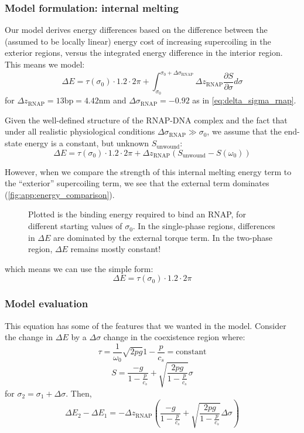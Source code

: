 \documentclass[11pt]{article}
\begin{document}
\subsubsection{Model formulation: internal melting}
Our model derives energy differences based on the difference between the (assumed to be locally linear) energy cost of increasing supercoiling in the exterior regions,
versus the integrated energy difference in the interior region. This means we model:
\[\Delta E = \tau(\sigma_0) \cdot 1.2 \cdot 2\pi + \int_{\sigma_0}^{\sigma_0 + \Delta \sigma_\text{RNAP}} \Delta z_\text{RNAP} \frac{\partial S}{\partial \sigma} d\sigma\]
for \(\Delta z_\text{RNAP} = 13 \text{bp} = 4.42 \text{nm}\) and \(\Delta \sigma_\text{RNAP} = -0.92\) as in \autoref{eq:delta_sigma_rnap}.

Given the well-defined structure of the RNAP-DNA complex and the fact that under all realistic physiological conditions \(\Delta \sigma_\text{RNAP} \gg \sigma_0\), we assume that the end-state energy is a constant, but unknown \(S_\text{unwound}\):
\begin{equation}
    \Delta E = \tau(\sigma_0) \cdot 1.2 \cdot 2\pi + \Delta z_\text{RNAP} \left(S_\text{unwound} - S(\omega_0)\right)
\end{equation}


However, when we compare the strength of this internal melting energy term to the ``exterior'' supercoiling term, we see that the external term dominates (\autoref{fig:app:energy_comparison}).
\begin{figure}[h]
    \centering
    \caption{Plotted is the binding energy required to bind an RNAP, for different starting values of \(\sigma_0\). In the single-phase regions, differences in \(\Delta E\) are dominated by the external torque term. In the two-phase region, \(\Delta E\) remains mostly constant!}
    \label{fig:app:energy_comparison}
\end{figure}
which means we can use the simple form:
\begin{equation}
    \Delta E = \tau(\sigma_0) \cdot 1.2 \cdot 2\pi
\end{equation}


\FloatBarrier
\subsubsection{Model evaluation}
This equation has some of the features that we wanted in the model. Consider the change in \(\Delta E\) by a \(\Delta \sigma\) change in the coexistence region where:
\[\tau = \frac{1}{\omega_0} \sqrt{2pg}{1 - \frac{p}{c_s}} = \text{constant}\]
\[S = \frac{-g}{1 - \frac{p}{c_s}} + \sqrt{\frac{2pg}{1 - \frac{p}{c_s}}} \sigma\]
for \(\sigma_2 = \sigma_1 + \Delta \sigma\). Then,
\[\Delta E_2 - \Delta E_1 = - \Delta z_\text{RNAP} \left( \frac{-g}{1 - \frac{p}{c_s}} + \sqrt{\frac{2pg}{1-\frac{p}{c_s}}} \Delta \sigma\right)\]
\end{document}
